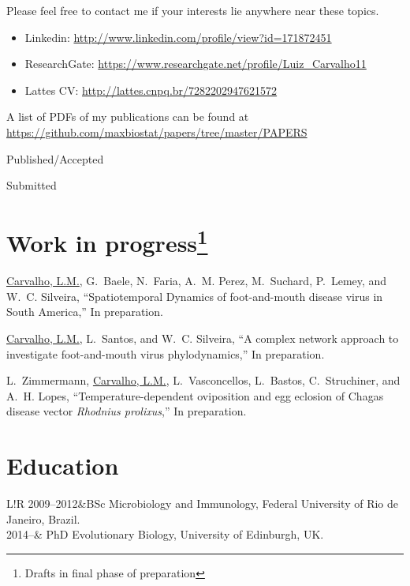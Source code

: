 \documentclass[10pt]{article}
\newcommand\VRule{\color{lightgray}\vrule width 0.5pt}
\begin{document}
Please feel free to contact me if your interests lie anywhere near these topics.

\begin{itemize}
\itemsep0.1em
 \item[] Linkedin: \url{http://www.linkedin.com/profile/view?id=171872451}\\
 \item[] ResearchGate: \url{https://www.researchgate.net/profile/Luiz_Carvalho11}\\
 \item[] Lattes CV: \url{ http://lattes.cnpq.br/7282202947621572} 
\end{itemize}

\newpage
A list of PDFs of my publications can be found at \url{https://github.com/maxbiostat/papers/tree/master/PAPERS}
\nocite{*}
\begin{category}{Published/Accepted}
\end{category}
\begin{category}{Submitted}
\SBentries{}
\end{category}


\section*{Work in progress\footnote{Drafts in final phase of preparation}}

\underline{Carvalho, L.M.}, G.~Baele, N.~Faria, A.~M. Perez, M.~Suchard, P.~Lemey, and  W.~C. Silveira, ``{S}patiotemporal {D}ynamics of foot-and-mouth disease virus in {S}outh {A}merica,'' In preparation.

\underline{Carvalho, L.M.}, L.~Santos, and W.~C. Silveira, ``A complex network approach to investigate foot-and-mouth virus phylodynamics,'' In preparation.

L.~Zimmermann, \underline{Carvalho, L.M.}, L.~Vasconcellos, L.~Bastos, C.~Struchiner, and A.~H. Lopes, ``{T}emperature-dependent oviposition and egg eclosion of {C}hagas disease vector \textit{{R}hodnius prolixus},'' In preparation.

\newpage
\section*{Education}
\begin{tabular}{L!{\VRule}R}
2009--2012&BSc Microbiology and Immunology, Federal University of Rio de Janeiro, Brazil.\\
2014--& PhD Evolutionary Biology, University of Edinburgh, UK.
\end{tabular}
\end{document}
